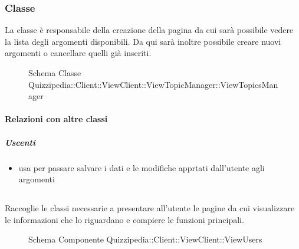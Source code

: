 \subsubsection{Classe }
La classe è responsabile della creazione della pagina da cui sarà possibile vedere la lista degli argomenti disponibili. Da qui sarà inoltre possibile creare nuovi argomenti o cancellare quelli già inseriti.
\begin{figure}[H]
\centering
\noindent{}
\caption[Schema Classe ViewTopicsManager]{Schema Classe Quizzipedia::Client::ViewClient::ViewTopicManager::ViewTopicsManager}
\end{figure}
\paragraph{Relazioni con altre classi}
\subparagraph{Uscenti}
\begin{itemize}
\item usa  per passare salvare i dati e le modifiche apprtati dall'utente agli argomenti
\end{itemize}
\subsection{}
Raccoglie le classi necessarie a presentare all'utente le pagine da cui visualizzare le informazioni che lo riguardano e compiere le funzioni principali.
\begin{figure}[H]
\centering
\noindent{}
\caption[Schema Componente Quizzipedia::Client::ViewClient::ViewUsers]{Schema Componente Quizzipedia::Client::ViewClient::ViewUsers}
\end{figure}
